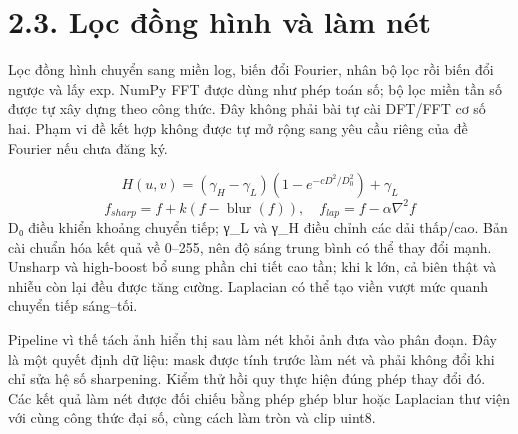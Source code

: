 \documentclass[13pt,a4paper]{extreport}
\begin{document}
\section*{2.3. Lọc đồng hình và làm nét}
Lọc đồng hình chuyển sang miền log, biến đổi Fourier, nhân bộ lọc rồi biến đổi ngược và lấy exp. NumPy FFT được dùng như phép toán số; bộ lọc miền tần số được tự xây dựng theo công thức. Đây không phải bài tự cài DFT/FFT cơ số hai. Phạm vi đề kết hợp không được tự mở rộng sang yêu cầu riêng của đề Fourier nếu chưa đăng ký.
\par
\begin{equation}H(u,v)=(\gamma_H-\gamma_L)(1-e^{-cD^2/D_0^2})+\gamma_L\tag{2.5}\end{equation}
\begin{equation}f_{sharp}=f+k(f-\operatorname{blur}(f)),\quad f_{lap}=f-\alpha\nabla^2 f\tag{2.6}\end{equation}
D₀ điều khiển khoảng chuyển tiếp; γ\_L và γ\_H điều chỉnh các dải thấp/cao. Bản cài chuẩn hóa kết quả về 0–255, nên độ sáng trung bình có thể thay đổi mạnh. Unsharp và high-boost bổ sung phần chi tiết cao tần; khi k lớn, cả biên thật và nhiễu còn lại đều được tăng cường. Laplacian có thể tạo viền vượt mức quanh chuyển tiếp sáng–tối.
\par
Pipeline vì thế tách ảnh hiển thị sau làm nét khỏi ảnh đưa vào phân đoạn. Đây là một quyết định dữ liệu: mask được tính trước làm nét và phải không đổi khi chỉ sửa hệ số sharpening. Kiểm thử hồi quy thực hiện đúng phép thay đổi đó. Các kết quả làm nét được đối chiếu bằng phép ghép blur hoặc Laplacian thư viện với cùng công thức đại số, cùng cách làm tròn và clip uint8.
\par
\clearpage
\end{document}
